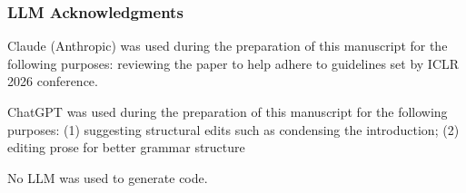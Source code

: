 \documentclass{article}
\begin{document}
\subsubsection*{LLM Acknowledgments}
Claude (Anthropic) was used during the preparation of this manuscript for the following purposes: reviewing the paper to help adhere to guidelines set by ICLR 2026 conference. 

ChatGPT was used during the preparation of this manuscript for the following purposes: (1) suggesting structural edits such as condensing the introduction; (2) editing prose for better grammar structure

No LLM was used to generate code.




\end{document}
